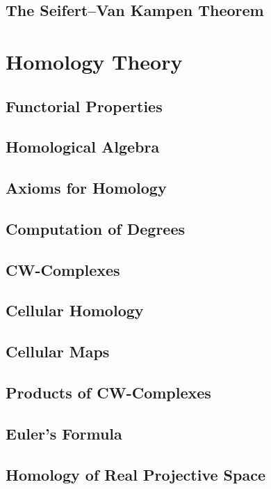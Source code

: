 \documentclass[oneside]{amsbook}
\numberwithin{prob}{section}
\begin{document}
\section{The Seifert--Van Kampen Theorem}


\chapter{Homology Theory}
\setcounter{section}{3}
\section{Functorial Properties}

\section{Homological Algebra}

\section{Axioms for Homology}

\section{Computation of Degrees}

\section{CW-Complexes}

\setcounter{section}{9}
\section{Cellular Homology}

\section{Cellular Maps}

\section{Products of CW-Complexes}

\section{Euler's Formula}

\section{Homology of Real Projective Space}

\setcounter{section}{17}
\end{document}

